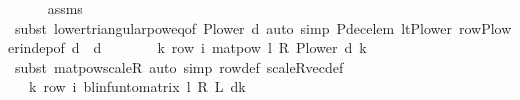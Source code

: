 \begin{isabellebody}
\ \ \ \ \isamarkupfalse%
\ assms\ \isanewline
\ \ \ \ \isamarkupfalse%
\ {\isacharparenleft}{\kern0pt}subst\ lower{\isacharunderscore}{\kern0pt}triangular{\isacharunderscore}{\kern0pt}pow{\isacharunderscore}{\kern0pt}eq{\isacharbrackleft}{\kern0pt}of\ {\isachardoublequoteopen}P{\isacharunderscore}{\kern0pt}lower\ d{\isacharprime}{\kern0pt}{\isachardoublequoteclose}{\isacharbrackright}{\kern0pt}{\isacharparenright}{\kern0pt}\ {\isacharparenleft}{\kern0pt}auto\ simp{\isacharcolon}{\kern0pt}\ P{\isacharunderscore}{\kern0pt}dec{\isacharunderscore}{\kern0pt}elem\ lt{\isacharunderscore}{\kern0pt}P{\isacharunderscore}{\kern0pt}lower\ row{\isacharunderscore}{\kern0pt}P{\isacharunderscore}{\kern0pt}lower{\isacharunderscore}{\kern0pt}indep{\isacharbrackleft}{\kern0pt}of\ d{\isacharprime}{\kern0pt}\ {\isacharunderscore}{\kern0pt}\ d{\isacharbrackright}{\kern0pt}{\isacharparenright}{\kern0pt}\isanewline
\ \ \isamarkupfalse%
\ \isamarkupfalse%
\ {\isachardoublequoteopen}{\isasymdots}\ {\isacharequal}{\kern0pt}\ {\isacharparenleft}{\kern0pt}{\isasymSum}k{\isachardot}{\kern0pt}\ row\ i\ {\isacharparenleft}{\kern0pt}matpow\ {\isacharparenleft}{\kern0pt}l\ {\isacharasterisk}{\kern0pt}\isactrlsub R\ {\isacharparenleft}{\kern0pt}P{\isacharunderscore}{\kern0pt}lower\ d{\isacharprime}{\kern0pt}{\isacharparenright}{\kern0pt}{\isacharparenright}{\kern0pt}\ k{\isacharparenright}{\kern0pt}{\isacharparenright}{\kern0pt}{\isachardoublequoteclose}\isanewline
\ \ \ \ \isamarkupfalse%
\ {\isacharparenleft}{\kern0pt}subst\ matpow{\isacharunderscore}{\kern0pt}scaleR{\isacharparenright}{\kern0pt}\ {\isacharparenleft}{\kern0pt}auto\ simp{\isacharcolon}{\kern0pt}\ row{\isacharunderscore}{\kern0pt}def\ scaleR{\isacharunderscore}{\kern0pt}vec{\isacharunderscore}{\kern0pt}def{\isacharparenright}{\kern0pt}\isanewline
\ \ \isamarkupfalse%
\ \isamarkupfalse%
\ {\isachardoublequoteopen}{\isasymdots}\ {\isacharequal}{\kern0pt}\ {\isacharparenleft}{\kern0pt}{\isasymSum}k{\isachardot}{\kern0pt}\ row\ i\ {\isacharparenleft}{\kern0pt}blinfun{\isacharunderscore}{\kern0pt}to{\isacharunderscore}{\kern0pt}matrix\ {\isacharparenleft}{\kern0pt}{\isacharparenleft}{\kern0pt}l\ {\isacharasterisk}{\kern0pt}\isactrlsub R\ {\isasymP}\isactrlsub L\ d{\isacharprime}{\kern0pt}{\isacharparenright}{\kern0pt}{\isacharcircum}{\kern0pt}{\isacharcircum}{\kern0pt}k{\isacharparenright}{\kern0pt}{\isacharparenright}{\kern0pt}{\isacharparenright}{\kern0pt}{\isachardoublequoteclose}\isanewline
\ \ \ \ \isamarkupfalse%

\end{isabellebody}
